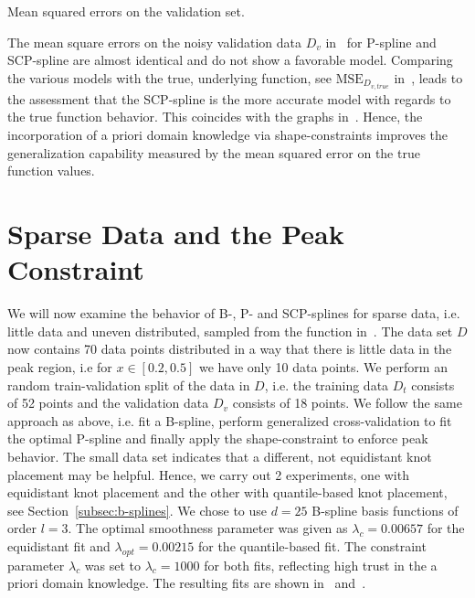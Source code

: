 \begin{table}[H]
	\begin{center}
	\end{center}
	\caption{Mean squared errors on the validation set.}
	\label{tab:test-func-peak-mses}
\end{table}
%
The mean square errors on the noisy validation data $D_v$ in~ for P-spline and SCP-spline are almost identical and do not show a favorable model. Comparing the various models with the true, underlying function, see $\text{MSE}_{D_{v,true}}$ in~, leads to the assessment that the SCP-spline is the more accurate model with regards to the true function behavior. This coincides with the graphs in~. Hence, the incorporation of a priori domain knowledge via shape-constraints improves the generalization capability measured by the mean squared error on the true function values. 

\section{Sparse Data and the Peak Constraint}

We will now examine the behavior of B-, P- and SCP-splines for sparse data, i.e. little data and uneven distributed, sampled from the function in~. The data set $D$ now contains 70 data points distributed in a way that there is little data in the peak region, i.e for $x \in [0.2, 0.5]$ we have only 10 data points. We perform an random train-validation split of the data in $D$, i.e. the training data $D_t$ consists of 52 points and the validation data $D_v$ consists of 18 points. We follow the same approach as above, i.e. fit a B-spline, perform generalized cross-validation to fit the optimal P-spline and finally apply the shape-constraint to enforce peak behavior. The small data set indicates that a different, not equidistant knot placement may be helpful. Hence, we carry out 2 experiments, one with equidistant knot placement and the other with quantile-based knot placement, see Section~\ref{subsec:b-splines}. We chose to use $d=25$ B-spline basis functions of order $l=3$. The optimal smoothness parameter was given as $\lambda_c = 0.00657$ for the equidistant fit and $\lambda_{opt} = 0.00215$ for the quantile-based fit. The constraint parameter $\lambda_c$ was set to $\lambda_c=1000$ for both fits, reflecting high trust in the a priori domain knowledge. The resulting fits are shown in~ and~.


